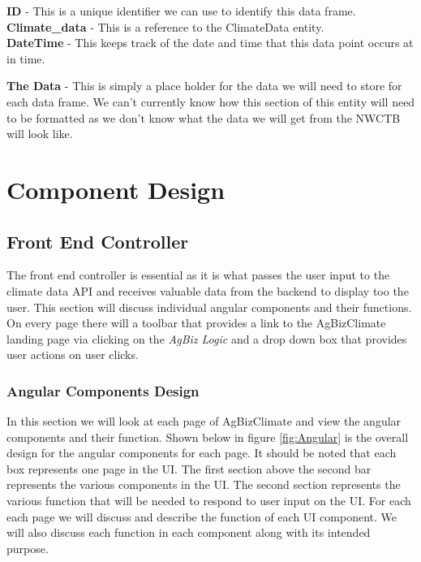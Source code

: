 \documentclass[onecolumn, draftclsnofoot,10pt, compsoc]{article}
\begin{document}
					\textbf{ID} - This is a unique identifier we can use to identify this data frame.\\

					\textbf{Climate\_data} - This is a reference to the ClimateData entity.\\

					\textbf{DateTime} - This keeps track of the date and time that this data point occurs at in time.

					\textbf{The Data} - This is simply a place holder for the data we will need to store for each data frame. We can't currently know how this section of this entity will need to be formatted as we don't know what the data we will get from the NWCTB will look like.\\





\section{Component Design}

	\subsection{Front End Controller}
		The front end controller is essential as it is what passes the user input to the climate data API and receives valuable data from the backend to display too the user. This section will discuss individual angular components and their functions. On every page there will a toolbar that provides a link to the AgBizClimate landing page via clicking on the \textit{AgBiz Logic} and a drop down box that provides user actions on user clicks.\\
		\subsubsection{Angular Components Design}
		In this section we will look at each page of AgBizClimate and view the angular components and their function. Shown below in figure \ref{fig:Angular} is the overall design for the angular components for each page. It should be noted that each box represents one page in the UI. The first section above the second bar represents the various components in the UI. The second section represents the various function that will be needed to respond to user input on the UI. For each each page we will discuss and describe the function of each UI component. We will also discuss each function in each component along with its intended purpose.\\
		
\end{document}
